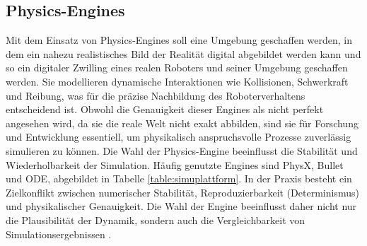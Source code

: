 \subsection{Physics-Engines}
Mit dem Einsatz von {Physics-Engines} soll eine Umgebung geschaffen werden, in
dem ein nahezu realistisches Bild der Realität digital abgebildet werden kann
und so ein digitaler Zwilling eines realen Roboters und seiner Umgebung
geschaffen werden. Sie modellieren dynamische Interaktionen wie Kollisionen,
Schwerkraft und Reibung, was für die präzise Nachbildung des Roboterverhaltens
entscheidend ist. Obwohl die Genauigkeit dieser Engines als nicht perfekt
angesehen wird, da sie die reale Welt nicht exakt
abbilden, sind sie für
Forschung und Entwicklung essentiell, um physikalisch anspruchsvolle Prozesse
zuverlässig simulieren zu können. Die Wahl der Physics-Engine
beeinflusst die Stabilität und Wiederholbarkeit der
Simulation. Häufig genutzte Engines sind PhysX, Bullet und ODE, abgebildet in
Tabelle \ref{table:simuplattform}.
\noindent
In der Praxis besteht ein Zielkonflikt zwischen numerischer Stabilität,
Reproduzierbarkeit (Determinismus) und physikalischer Genauigkeit. Die Wahl der
Engine beeinflusst daher nicht nur die Plausibilität der Dynamik, sondern auch
die Vergleichbarkeit von Simulationsergebnissen .

